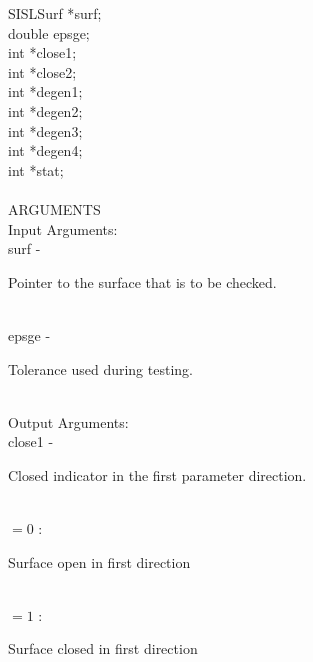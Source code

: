                 \>\>    SISLSurf        \>      *{\fov surf};\\
                \>\>    double  \>      {\fov epsge};\\
                \>\>    int     \>      *{\fov close1};\\
                \>\>    int     \>      *{\fov close2};\\
                \>\>    int     \>      *{\fov degen1};\\
                \>\>    int     \>      *{\fov degen2};\\
                \>\>    int     \>      *{\fov degen3};\\
                \>\>    int     \>      *{\fov degen4};\\
                \>\>    int     \>      *{\fov stat};\\
\\
ARGUMENTS\\
        \>Input Arguments:\\
        \>\>    {\fov surf}\> - \>              \begin{minipg2}
                                Pointer to the surface that is to be checked.
                                \end{minipg2}\\[0.3ex]
        \>\>    {\fov epsge}\> - \>     \begin{minipg2}
                                Tolerance used during testing.
                                \end{minipg2}\\
\newpagetabs
        \>Output Arguments:\\
        \>\>    {\fov close1}\> - \>    \begin{minipg2}
                                Closed indicator in the first parameter direction.
                                \end{minipg2}\\
                \>\>\>\>\>      $=0$ :\>\begin{minipg5}
                                Surface open in first direction
                                \end{minipg5}\\
                \>\>\>\>\>      $=1$ :\>\begin{minipg5}
                                Surface closed in first direction
                                \end{minipg5}\\
